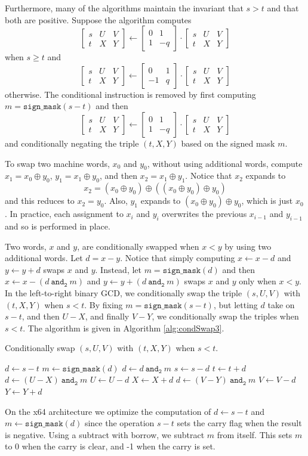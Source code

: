 \documentclass{ucalgthes1}
\theoremstyle{definition}
\newcommand{\matrixtt}[4]{\left[ \begin{array}{rr} #1 & #2 \\ #3 & #4 \end{array} \right]}
\newcommand{\matrixThreeTwo}[6]{\left[ \begin{array}{rrr} #1 & #2 & #3 \\ #4 & #5 & #6 \end{array} \right]}
\newcommand{\band}{~\texttt{and}_\texttt{2}~}
\newcommand{\bxor}{\oplus}
\begin{document}
Furthermore, many of the algorithms maintain the invariant that $s > t$ and that both are positive.  Suppose the algorithm computes
\[
 \matrixThreeTwo{s}{U}{V}{t}{X}{Y} \gets \matrixtt{0}{1}{1}{-q} \cdot \matrixThreeTwo{s}{U}{V}{t}{X}{Y}
\]
when $s \ge t$ and
\[
\matrixThreeTwo{s}{U}{V}{t}{X}{Y} \gets \matrixtt{0}{1}{-1}{q} \cdot \matrixThreeTwo{s}{U}{V}{t}{X}{Y}
\]
otherwise.  The conditional instruction is removed by first computing $m = \texttt{sign\_mask}(s - t)$ and then 
\[
 \matrixThreeTwo{s}{U}{V}{t}{X}{Y} \gets \matrixtt{0}{1}{1}{-q} \cdot \matrixThreeTwo{s}{U}{V}{t}{X}{Y}
\]
and conditionally negating the triple $(t, X, Y)$ based on the signed mask $m$.

To swap two machine words, $x_0$ and $y_0$, without using additional words, compute $x_1 = x_0 \bxor y_0$, $y_1 = x_1 \bxor y_0$, and then $x_2 = x_1 \bxor y_1$.  Notice that $x_2$ expands to
\[
	x_2 = (x_0 \bxor y_0) \bxor ((x_0 \bxor y_0) \bxor y_0)
\]
and this reduces to $x_2 = y_0$.  Also, $y_1$ expands to $(x_0 \bxor y_0) \bxor y_0$, which is just $x_0$.  In practice, each assignment to $x_i$ and $y_i$ overwrites the previous $x_{i-1}$ and $y_{i-1}$ and so is performed in place.

Two words, $x$ and $y$, are conditionally swapped when $x < y$ by using two additional words.  Let $d = x - y$.  Notice that simply computing $x \gets x - d$ and $y \gets y + d$ swaps $x$ and $y$.  Instead, let $m = \texttt{sign\_mask}(d)$ and then  $x \gets x - (d \band m)$ and $y \gets y + (d \band m)$ swaps $x$ and $y$ only when $x < y$.  In the left-to-right binary GCD, we conditionally swap the triple $(s, U, V)$ with $(t, X, Y)$ when $s < t$.  By fixing $m = \texttt{sign\_mask}(s - t)$, but letting $d$ take on $s - t$, and then $U - X$, and finally $V - Y$, we conditionally swap the triples when $s < t$. The algorithm is given in Algorithm \ref{alg:condSwap3}.
\begin{algorithm}[htb]
\caption{Conditionally swap $(s, U, V)$ with $(t, X, Y)$ when $s < t$.}
\label{alg:condSwap3}
\begin{algorithmic}[1]
\State $d \gets s - t$
\State $m \gets \texttt{sign\_mask}(d)$
\State $d \gets d \band m$
\State $s \gets s - d$
\State $t \gets t + d$
\State $d \gets (U - X) \band m$
\State $U \gets U - d$
\State $X \gets X + d$
\State $d \gets (V - Y) \band m$
\State $V \gets V - d$
\State $Y \gets Y + d$
\end{algorithmic}
\end{algorithm}
On the x64 architecture we optimize the computation of $d \gets s - t$ and $m \gets \texttt{sign\_mask}(d)$ since the operation $s-t$ sets the carry flag when the result is negative.  Using a subtract with borrow, we subtract $m$ from itself.  This sets $m$ to 0 when the carry is clear, and -1 when the carry is set.
\end{document}
